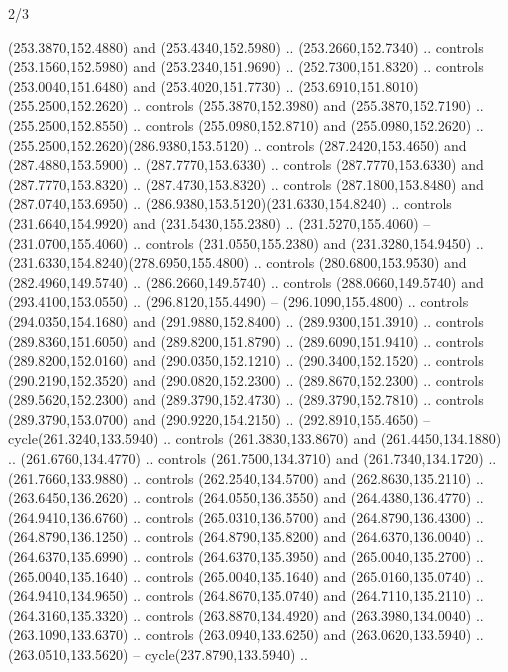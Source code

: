 \begin{flagdescription}{2/3}
\begin{scope}[xshift=0.5\flaglength,yshift=0.5\flagwidth,scale=\flagwidth/259.2]
\begin{scope}[y=0.8pt, x=0.8pt, yscale=-1,shift={(-243,-162)}]
      (253.3870,152.4880) and (253.4340,152.5980) .. (253.2660,152.7340) .. controls
      (253.1560,152.5980) and (253.2340,151.9690) .. (252.7300,151.8320) .. controls
      (253.0040,151.6480) and (253.4020,151.7730) ..
      (253.6910,151.8010)(255.2500,152.2620) .. controls (255.3870,152.3980) and
      (255.3870,152.7190) .. (255.2500,152.8550) .. controls (255.0980,152.8710) and
      (255.0980,152.2620) .. (255.2500,152.2620)(286.9380,153.5120) .. controls
      (287.2420,153.4650) and (287.4880,153.5900) .. (287.7770,153.6330) .. controls
      (287.7770,153.6330) and (287.7770,153.8320) .. (287.4730,153.8320) .. controls
      (287.1800,153.8480) and (287.0740,153.6950) ..
      (286.9380,153.5120)(231.6330,154.8240) .. controls (231.6640,154.9920) and
      (231.5430,155.2380) .. (231.5270,155.4060) -- (231.0700,155.4060) .. controls
      (231.0550,155.2380) and (231.3280,154.9450) ..
      (231.6330,154.8240)(278.6950,155.4800) .. controls (280.6800,153.9530) and
      (282.4960,149.5740) .. (286.2660,149.5740) .. controls (288.0660,149.5740) and
      (293.4100,153.0550) .. (296.8120,155.4490) -- (296.1090,155.4800) .. controls
      (294.0350,154.1680) and (291.9880,152.8400) .. (289.9300,151.3910) .. controls
      (289.8360,151.6050) and (289.8200,151.8790) .. (289.6090,151.9410) .. controls
      (289.8200,152.0160) and (290.0350,152.1210) .. (290.3400,152.1520) .. controls
      (290.2190,152.3520) and (290.0820,152.2300) .. (289.8670,152.2300) .. controls
      (289.5620,152.2300) and (289.3790,152.4730) .. (289.3790,152.7810) .. controls
      (289.3790,153.0700) and (290.9220,154.2150) .. (292.8910,155.4650) --
      cycle(261.3240,133.5940) .. controls (261.3830,133.8670) and
      (261.4450,134.1880) .. (261.6760,134.4770) .. controls (261.7500,134.3710) and
      (261.7340,134.1720) .. (261.7660,133.9880) .. controls (262.2540,134.5700) and
      (262.8630,135.2110) .. (263.6450,136.2620) .. controls (264.0550,136.3550) and
      (264.4380,136.4770) .. (264.9410,136.6760) .. controls (265.0310,136.5700) and
      (264.8790,136.4300) .. (264.8790,136.1250) .. controls (264.8790,135.8200) and
      (264.6370,136.0040) .. (264.6370,135.6990) .. controls (264.6370,135.3950) and
      (265.0040,135.2700) .. (265.0040,135.1640) .. controls (265.0040,135.1640) and
      (265.0160,135.0740) .. (264.9410,134.9650) .. controls (264.8670,135.0740) and
      (264.7110,135.2110) .. (264.3160,135.3320) .. controls (263.8870,134.4920) and
      (263.3980,134.0040) .. (263.1090,133.6370) .. controls (263.0940,133.6250) and
      (263.0620,133.5940) .. (263.0510,133.5620) -- cycle(237.8790,133.5940) ..

\end{scope}
\end{scope}
\end{flagdescription}
